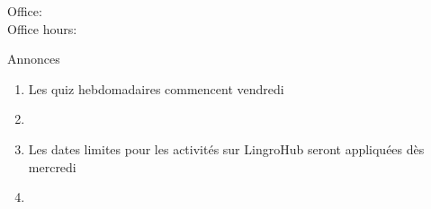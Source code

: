 \documentclass{beamer}
\subtitle[À la fac, articles, lettres]{À la fac, les articles et les lettres}
\begin{document}
  \begin{frame}
    \titlepage
    \tiny{Office: \\
          Office hours: }
  \end{frame}

  \begin{frame}{Annonces }
    \begin{enumerate}
      \item Les quiz hebdomadaires commencent vendredi
      \item[] 
      \item Les dates limites pour les activités sur LingroHub seront appliquées dès mercredi
      \item[] 
    \end{enumerate}
  \end{frame}

\end{document}
